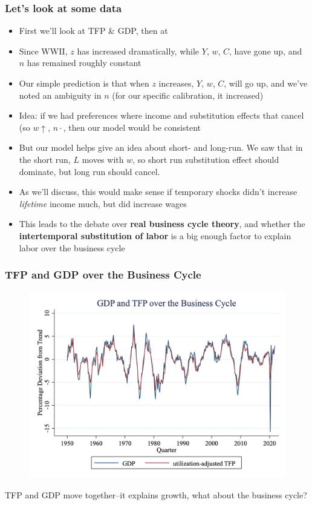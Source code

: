 \documentclass{beamer}
\begin{document}
\begin{frame}
\frametitle[alignment=center]{Let's look at some data}
\begin{itemize}
\item First we'll look at TFP \& GDP, then at
\bigskip
\item Since WWII, $z$ has increased dramatically, while $Y$, $w$, $C$, have gone up, and $n$ has remained roughly constant
\bigskip
\item Our simple prediction is that when $z$ increases, $Y$, $w$, $C$, will go up, and we've noted an ambiguity in $n$ (for our specific calibration, it increased)
\bigskip
\item Idea:  if we had preferences where income and substitution effects that cancel (so $w\uparrow$, $n\cdot$, then our model would be consistent
\bigskip
\item But our model helps give an idea about short- and long-run.  We saw that in the short run, $L$ moves with $w$, so short run substitution effect should dominate, but long run should cancel.
\bigskip
\item As we'll discuss, this would make sense if temporary shocks didn't increase \emph{lifetime} income much, but did increase wages
\bigskip
\item This leads to the debate over \textbf{real business cycle theory}, and whether the \textbf{intertemporal substitution of labor} is a big enough factor to explain labor over the business cycle
\end{itemize}
\end{frame}


\begin{frame}
\frametitle[alignment=center]{TFP and GDP over the Business Cycle}
\begin{figure}
\centering
\includegraphics[scale=0.2]{Figures/GDP_TFP_buscycle.png}
\end{figure}
TFP and GDP move together--it explains growth, what about the business cycle?  
\end{frame}
\end{document}
